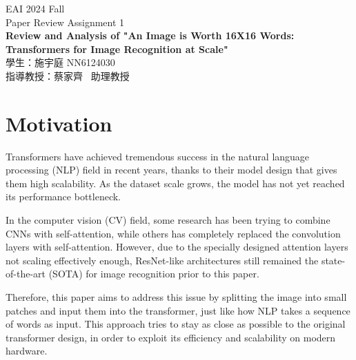 \documentclass[12pt]{article}
\begin{document}


\begin{titlepage}
\begin{center}

\vspace*{1cm}
\large EAI 2024 Fall \\
\Large Paper Review Assignment 1 \\

\vspace{2cm}
\LARGE \textbf{Review and Analysis of "An Image is Worth 16X16 Words: Transformers for Image Recognition at Scale"} \\

\vfill
\normalsize
學生：施宇庭 NN6124030 \\ [0.2cm]
指導教授：蔡家齊 \ 助理教授 \\ [0.2cm]

\end{center}
\end{titlepage}



\section{Motivation}

Transformers have achieved tremendous success in the natural language processing (NLP) field in recent years, thanks to their model design that gives them high scalability. As the dataset scale grows, the model has not yet reached its performance bottleneck.

In the computer vision (CV) field, some research has been trying to combine CNNs with self-attention, while others has completely replaced the convolution layers with self-attention. However, due to the specially designed attention layers not scaling effectively enough, ResNet-like architectures still remained the state-of-the-art (SOTA) for image recognition prior to this paper.

Therefore, this paper aims to address this issue by splitting the image into small patches and input them into the transformer, just like how NLP takes a sequence of words as input. This approach tries to stay as close as possible to the original transformer design, in order to exploit its efficiency and scalability on modern hardware.
\end{document}
